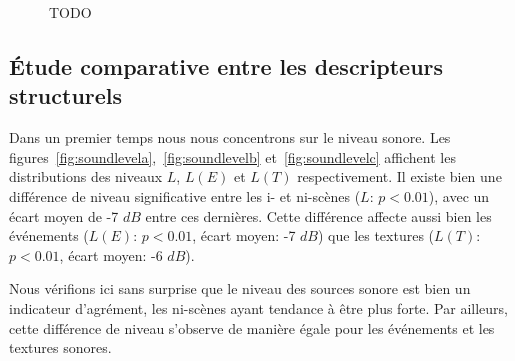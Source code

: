 \begin{figure}[t]
        \myfloatalign
       \caption[TODO]{TODO}\label{fig:xp2_A}
\end{figure}
 
\subsection{Étude comparative entre les descripteurs structurels}

Dans un premier temps nous nous concentrons sur le niveau sonore. Les figures~\ref{fig:soundlevela},~\ref{fig:soundlevelb} et~\ref{fig:soundlevelc} affichent les distributions des niveaux $L$, $L(E)$ et $L(T)$ respectivement. Il existe bien une différence de niveau significative entre les i- et ni-scènes ($L$: $p<0.01$), avec un écart moyen de -7 $dB$ entre ces dernières. Cette différence affecte aussi bien les événements ($L(E)$: $p<0.01$, écart moyen: -7 $dB$) que les textures ($L(T)$: $p<0.01$, écart moyen: -6 $dB$). 

Nous vérifions ici sans surprise que le niveau des sources sonore est bien un indicateur d'agrément, les ni-scènes ayant tendance à être plus forte. Par ailleurs, cette différence de niveau s'observe de manière égale pour les événements et les textures sonores. 

